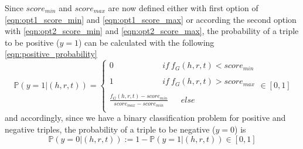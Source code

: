 Since $score_{min}$ and $score_{max}$ are now defined either with first option of 
\autoref{eqn:opt1_score_min} and \ref{eqn:opt1_score_max} or according the second option with 
\autoref{eqn:opt2_score_min} and \ref{eqn:opt2_score_max}, the probability of a triple to be positive ($y = 1$) can be calculated with the following \autoref{eqn:positive_probability}
\begin{equation}  \label{eqn:positive_probability}
    \mathds{P}(y = 1|(h, r, t)) =
    \begin{cases}
        0 \ \ \ \ \ \ \ \ \ \ \ \ \ \ \ \ \ \ \ \ \ \ \ \ \ \ \  
        if \  f_G(h,r,t) < score_{min}
         
        \\ \\
        1 \ \ \ \ \ \ \ \ \ \ \ \ \ \ \ \ \ \ \ \ \ \ \ \ \ \ \ 
        if \ f_G(h,r,t) > score_{max}
         
        \\ \\
        \frac{f_G(h,r,t) - score_{min}}{score_{max} - score_{min}}
        \ \ \ \ \ \ \ 
        else
        \\
    \end{cases}  \in [0, 1]
\end{equation}
and accordingly, since we have a binary classification problem for positive and negative triples, the probability of a triple to be negative ($y=0$) is
\begin{equation} \label{eqn:negative_probability}
    \mathds{P}(y = 0|(h, r, t)) := 1 - \mathds{P}(y = 1|(h, r, t)) \in [0,1]
\end{equation}


